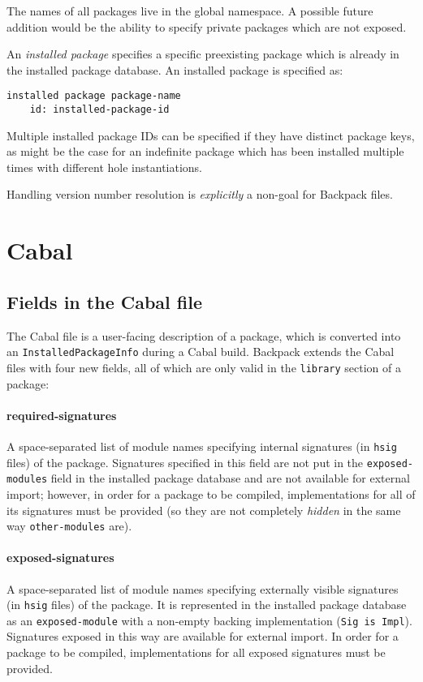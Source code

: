 \documentclass{article}
\newcommand{\Red}[1]{{\color{red} #1}}
\begin{document}
The names of all packages live in the global namespace.
A possible future addition would be the ability to specify private
packages which are not exposed.

An \emph{installed package} specifies a specific preexisting package
which is already in the installed package database.  An installed
package is specified as:

\begin{verbatim}
installed package package-name
    id: installed-package-id
\end{verbatim}

Multiple installed package IDs can be specified if they have
distinct package keys, as might be the case for an indefinite package
which has been installed multiple times with different hole instantiations.

Handling version number resolution is \emph{explicitly} a non-goal for
Backpack files.

\section{Cabal}

\subsection{Fields in the Cabal file}

The Cabal file is a user-facing description of a package, which is
converted into an \texttt{InstalledPackageInfo} during a Cabal build.
Backpack extends the Cabal files with four new fields, all of which
are only valid in the \texttt{library} section of a package:

\paragraph{required-signatures}  A space-separated list of module names
specifying internal signatures (in \texttt{hsig} files) of the package.
\Red{Signatures specified in this field are not put in the \texttt{exposed-modules} field in the installed package database and
are not available for external import}; however, in order for a package to be
compiled, implementations for all of its signatures must be provided (so
they are not completely \emph{hidden} in the same way \texttt{other-modules} are).

\paragraph{exposed-signatures}  A space-separated list of module names
specifying externally visible signatures (in \texttt{hsig} files) of the package.  It is
represented in the installed package database as an \texttt{exposed-module} with a
non-empty backing implementation (\texttt{Sig is Impl}). Signatures exposed in this way are
available for external import.  In order for a package to be compiled,
implementations for all exposed signatures must be provided.
\end{document}
